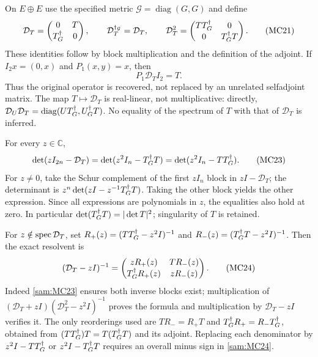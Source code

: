 \documentclass[11pt]{article}
\begin{document}
On \(E\oplus E\) use the specified metric
\(\mathcal G=\operatorname{diag}(G,G)\) and define
\begin{equation}
 \mathcal D_T=
 \begin{pmatrix}0&T\\T^\dagger_G&0\end{pmatrix},
 \qquad
 \mathcal D_T^{\dagger_{\mathcal G}}=\mathcal D_T,\qquad
 \mathcal D_T^2=
 \begin{pmatrix}TT^\dagger_G&0\\0&T^\dagger_G T\end{pmatrix}.
 \tag{MC21}\label{sam:MC21}
\end{equation}
These identities follow by block multiplication and the definition of
the adjoint. If \(I_2x=(0,x)\) and \(P_1(x,y)=x\), then
\begin{equation}
 P_1\mathcal D_T I_2=T.
 \tag{MC22}\label{sam:MC22}
\end{equation}
Thus the original operator is recovered, not replaced by an unrelated
selfadjoint matrix. The map \(T\mapsto\mathcal D_T\) is real-linear,
not multiplicative: directly,
\(\mathcal D_U\mathcal D_T=\operatorname{diag}(UT^\dagger_G,U^\dagger_G T)\).
No equality of the spectrum of \(T\) with that of \(\mathcal D_T\)
is inferred.

For every \(z\in\mathbb C\),
\begin{equation}
 \det(zI_{2n}-\mathcal D_T)
  =\det(z^2I_n-T^\dagger_G T)
  =\det(z^2I_n-TT^\dagger_G).
 \tag{MC23}\label{sam:MC23}
\end{equation}
For \(z\ne0\), take the Schur complement of the first \(zI_n\)
block in \(zI-\mathcal D_T\); the determinant is
\(z^n\det(zI-z^{-1}T^\dagger_G T)\). Taking the other block yields
the other expression. Since all expressions are polynomials in \(z\),
the equalities also hold at zero. In particular
\(\det(T^\dagger_G T)=|\det T|^2\); singularity of \(T\) is retained.

For \(z\notin\operatorname{spec}\mathcal D_T\), set
\(R_+(z)=(TT^\dagger_G-z^2I)^{-1}\) and
\(R_-(z)=(T^\dagger_G T-z^2I)^{-1}\). Then the exact resolvent is
\begin{equation}
 (\mathcal D_T-zI)^{-1}
 =\begin{pmatrix}
 zR_+(z)&T R_-(z)\\
 T^\dagger_G R_+(z)&zR_-(z)
 \end{pmatrix}.
 \tag{MC24}\label{sam:MC24}
\end{equation}
Indeed \eqref{sam:MC23} ensures both inverse blocks exist; multiplication
of \((\mathcal D_T+zI)(\mathcal D_T^2-z^2I)^{-1}\) proves the
formula and multiplication by \(\mathcal D_T-zI\) verifies it.
The only reorderings used are \(TR_-=R_+T\) and
\(T^\dagger_G R_+=R_-T^\dagger_G\), obtained from
\((TT^\dagger_G)T=T(T^\dagger_G T)\) and its adjoint.
Replacing each denominator by \(z^2I-TT^\dagger_G\) or
\(z^2I-T^\dagger_G T\) requires an overall minus sign in \eqref{sam:MC24}.
\end{document}
